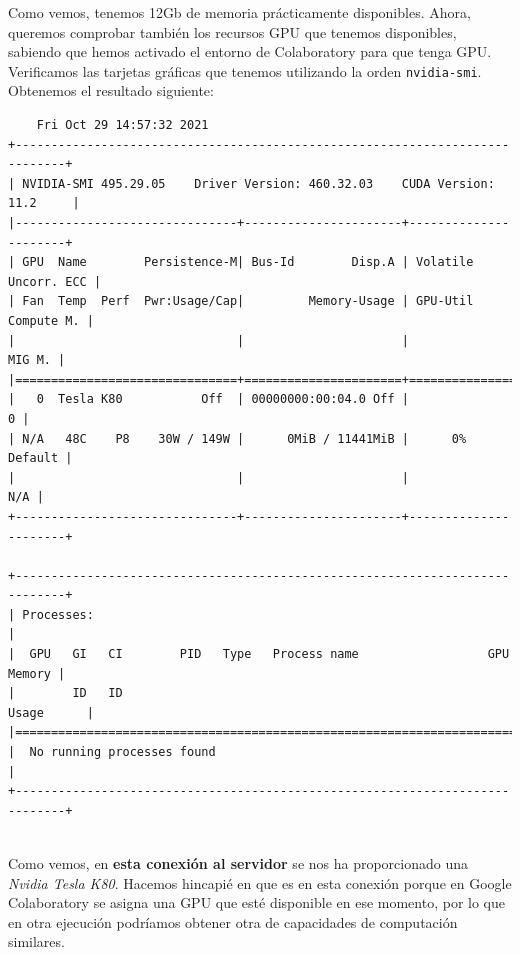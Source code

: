 \documentclass[11pt]{article}
\def\inline{\lstinline[basicstyle=\ttfamily,keywordstyle={}]}
\begin{document}
Como vemos, tenemos 12Gb de memoria prácticamente disponibles. Ahora, queremos comprobar también los recursos GPU que tenemos disponibles, sabiendo que hemos activado el entorno de Colaboratory para que tenga GPU. Verificamos las tarjetas gráficas que tenemos utilizando la orden \inline{nvidia-smi}. Obtenemos el resultado siguiente:\\

\begin{minipage}{0.7\textwidth}

\begin{verbatim}
	Fri Oct 29 14:57:32 2021       
+-----------------------------------------------------------------------------+
| NVIDIA-SMI 495.29.05    Driver Version: 460.32.03    CUDA Version: 11.2     |
|-------------------------------+----------------------+----------------------+
| GPU  Name        Persistence-M| Bus-Id        Disp.A | Volatile Uncorr. ECC |
| Fan  Temp  Perf  Pwr:Usage/Cap|         Memory-Usage | GPU-Util  Compute M. |
|                               |                      |               MIG M. |
|===============================+======================+======================|
|   0  Tesla K80           Off  | 00000000:00:04.0 Off |                    0 |
| N/A   48C    P8    30W / 149W |      0MiB / 11441MiB |      0%      Default |
|                               |                      |                  N/A |
+-------------------------------+----------------------+----------------------+
                                                                               
+-----------------------------------------------------------------------------+
| Processes:                                                                  |
|  GPU   GI   CI        PID   Type   Process name                  GPU Memory |
|        ID   ID                                                   Usage      |
|=============================================================================|
|  No running processes found                                                 |
+-----------------------------------------------------------------------------+
\end{verbatim}
\end{minipage}\\

Como vemos, en \textbf{esta conexión al servidor} se nos ha proporcionado una \emph{Nvidia Tesla K80}. Hacemos hincapié en que es en esta conexión porque en Google Colaboratory se asigna una GPU que esté disponible en ese momento, por lo que en otra ejecución podríamos obtener otra de capacidades de computación similares.
\end{document}
